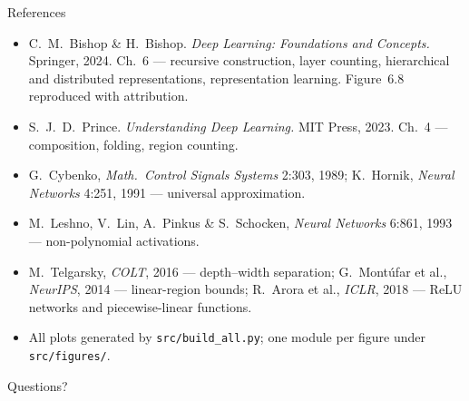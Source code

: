 \documentclass[aspectratio=169, 11pt]{beamer}
\newcommand{\nosrc}{}       %
\begin{document}
\begin{frame}{References}
  \nosrc
  \footnotesize
  \begin{itemize}\setlength{\itemsep}{2pt}
    \item C.~M.~Bishop \& H.~Bishop. \textit{Deep Learning:
          Foundations and Concepts.} Springer, 2024. Ch.~6 ---
          recursive construction, layer counting, hierarchical and
          distributed representations, representation learning.
          Figure~6.8 reproduced with attribution.
    \item S.~J.~D.~Prince. \textit{Understanding Deep Learning.}
          MIT Press, 2023. Ch.~4 --- composition, folding, region
          counting.
    \item G.~Cybenko, \textit{Math.\ Control Signals Systems} 2:303,
          1989; K.~Hornik, \textit{Neural Networks} 4:251, 1991 ---
          universal approximation.
    \item M.~Leshno, V.~Lin, A.~Pinkus \& S.~Schocken,
          \textit{Neural Networks} 6:861, 1993 --- non-polynomial
          activations.
    \item M.~Telgarsky, \textit{COLT}, 2016 --- depth--width
          separation; G.~Mont\'ufar et al., \textit{NeurIPS}, 2014
          --- linear-region bounds; R.~Arora et al., \textit{ICLR},
          2018 --- ReLU networks and piecewise-linear functions.
    \item All plots generated by \texttt{src/build\_all.py};
          one module per figure under \texttt{src/figures/}.
  \end{itemize}
\end{frame}

\begin{frame}[standout]
  \nosrc
  Questions?
\end{frame}
\end{document}

